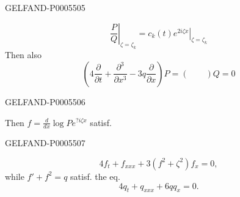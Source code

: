 \begin{GelfandAdjacentEvidence}{GELFAND-P000550}{5}

\[
\left.\frac P Q\right|_{\zeta=\zeta_k}
=\left.c_k(t)e^{2i\zeta x}\right|_{\zeta=\zeta_k}
\]
Then also
\[
\left(4\frac{\partial}{\partial t}+\frac{\partial^3}{\partial x^3}
-3q\frac{\partial}{\partial x}\right)P=(\qquad)Q=0
\]
\end{GelfandAdjacentEvidence}
\begin{GelfandAdjacentEvidence}{GELFAND-P000550}{6}


Then \(f=\frac{d}{dx}\log P e^{?i\zeta x}\) satisf.
\end{GelfandAdjacentEvidence}
\begin{GelfandAdjacentEvidence}{GELFAND-P000550}{7}

\[
4f_t+f_{xxx}+3(f^2+\zeta^2)f_x=0,
\]
while \(f'+f^2=q\) satisf. the eq.
\[
4q_t+q_{xxx}+6qq_x=0.
\]
\end{GelfandAdjacentEvidence}



